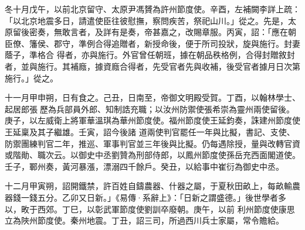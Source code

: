 \begin{pinyinscope}
 冬十月戊午，以前北京留守、太原尹馮贇為許州節度使。辛酉，左補闕李詳上疏：「以北京地震多日，請遣使臣往彼慰撫，察問疾苦，祭祀山川。」從之。先是，太原留後密奏，無敢言者，及詳有是奏，帝甚嘉之，改賜章服。丙寅，詔：「應在朝臣僚、籓侯、郡守，準例合得追贈者，新授命後，便于所司投狀，旋與施行。封妻蔭子，準格合
 得者，亦與施行。外官曾任朝班，據在朝品秩格例，合得封贈敘封者，並與施行。其補廕，據資廕合得者，先受官者先與收補，後受官者據月日次第施行。」從之。



 十一月甲申朔，日有食之。己丑，日南至，帝御文明殿受賀。丁酉，以翰林學士、起居郎張歷為兵部員外郎、知制誥充職；以汝州防禦使張希崇為靈州兩使留後。庚子，以左威衛上將軍華溫琪為華州節度使。福州節度使王延鈞奏，誅建州節度使王延稟及其子繼雄。壬寅，詔今後諸
 道兩使判官罷任一年與比擬，書記、支使、防禦團練判官二年，推巡、軍事判官並三年後與比擬。仍每遇除授，量與改轉官資或階勛、職次云。以御史中丞劉贊為刑部侍郎，以鳳州節度使孫岳充西面閣道使。壬子，鄆州奏，黃河暴漲，漂溺四千餘戶。癸丑，以給事中崔衍為御史中丞。



 十二月甲寅朔，詔開鐵禁，許百姓自鑄農器、什器之屬，于夏秋田畝上，每畝輸農器錢一錢五分。乙卯又日新。」《易傳·系辭上》：「日新之謂盛德。」後世學者多以，畋于西郊。丁巳，以彰武軍節度使劉訓卒廢朝。庚午，以前
 利州節度使康思立為陜州節度使。秦州地震。丁丑，詔三司，所過西川兵士家屬，常令贍給。



\end{pinyinscope}